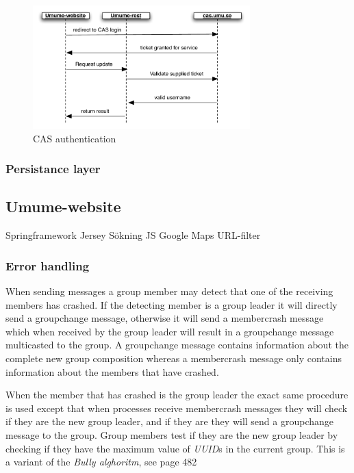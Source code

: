 \documentclass[titlepage, twocolumn, a4paper, 10pt]{article}
\begin{document}
\begin{figure}[!thb]
  \centering
  \includegraphics[width=3.3in]{images/auth.pdf}
  \caption{CAS authentication}
  \label{fig:images/auth}
\end{figure}

\subsubsection{Persistance layer}\label{sec:persistance}

\subsection{Umume-website}\label{sec:umume-website}

Springframework
Jersey
Sökning JS
Google Maps
URL-filter



\subsubsection{Error handling}\label{sec:error-handling}
When sending messages a group member may detect that one of the
receiving members has crashed. If the detecting member is a group
leader it will directly send a groupchange message, otherwise it will
send a membercrash message which when received by the group leader
will result in a groupchange message multicasted to the group. A
groupchange message contains information about the complete new group
composition whereas a membercrash message only contains information
about the members that have crashed.

When the member that has crashed is the group leader the exact same procedure is used except that when processes receive membercrash messages they will check if they are the new group leader, and if they are they will send a groupchange message to the group. Group members test if they are the new group leader by checking if they have the maximum value of \textit{UUID}s in the current group. This is a variant of the \textit{Bully alghoritm}, see page 482
\end{document}
